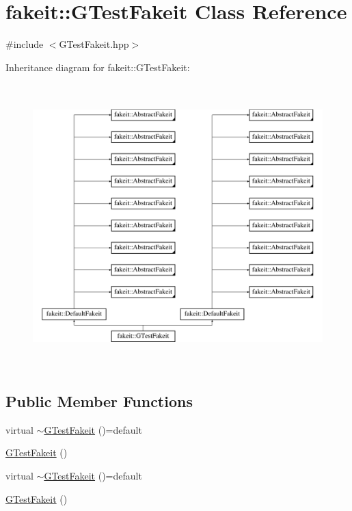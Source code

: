 \hypertarget{classfakeit_1_1GTestFakeit}{}\section{fakeit\+::G\+Test\+Fakeit Class Reference}
\label{classfakeit_1_1GTestFakeit}


{\ttfamily \#include $<$G\+Test\+Fakeit.\+hpp$>$}

Inheritance diagram for fakeit\+::G\+Test\+Fakeit\+:\begin{figure}[H]
\begin{center}
\leavevmode
\includegraphics[height=11.000000cm]{classfakeit_1_1GTestFakeit}
\end{center}
\end{figure}
\subsection*{Public Member Functions}
\begin{DoxyCompactItemize}
\item 
virtual \mbox{\hyperlink{classfakeit_1_1GTestFakeit_adac8418f661e952a4610c8304f2d42e1}{$\sim$\+G\+Test\+Fakeit}} ()=default
\item 
\mbox{\hyperlink{classfakeit_1_1GTestFakeit_a3fe2f25f77deaf24ff4db6238388fab6}{G\+Test\+Fakeit}} ()
\item 
virtual \mbox{\hyperlink{classfakeit_1_1GTestFakeit_adac8418f661e952a4610c8304f2d42e1}{$\sim$\+G\+Test\+Fakeit}} ()=default
\item 
\mbox{\hyperlink{classfakeit_1_1GTestFakeit_a3fe2f25f77deaf24ff4db6238388fab6}{G\+Test\+Fakeit}} ()
\end{DoxyCompactItemize}
